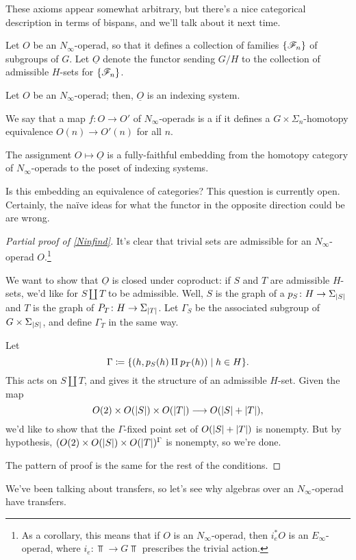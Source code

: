 These axioms appear somewhat arbitrary, but there's a nice categorical description in terms of bispans, and we'll
talk about it next time.
\begin{defn}
Let $O$ be an $N_\infty$-operad, so that it defines a collection of families $\{\mathscr F_n\}$ of subgroups of $G$.
Let $\underline O$ denote the functor sending $G/H$ to the collection of admissible $H$-sets for $\{\mathscr F_n\}$.
\end{defn}
\begin{prop}
\label{Ninfind}
Let $O$ be an $N_\infty$-operad; then, $\underline O$ is an indexing system.
\end{prop}
We say that a map $f\colon O\to O'$ of $N_\infty$-operads is a  if it defines a
$G\times\Sigma_n$-homotopy equivalence $O(n)\to O'(n)$ for all $n$.
\begin{thm}
The assignment $O\mapsto\underline O$ is a fully-faithful embedding from the homotopy category of
$N_\infty$-operads to the poset of indexing systems.
\end{thm}
\begin{ques}
Is this embedding an equivalence of categories? This question is currently open. Certainly, the naïve ideas for
what the functor in the opposite direction could be are wrong.
\end{ques}
\begin{proof}[Partial proof of \cref{Ninfind}]
It's clear that trivial sets are admissible for an $N_\infty$-operad $O$.\footnote{As a corollary, this means that
if $O$ is an $N_\infty$-operad, then $i_e^*O$ is an $E_\infty$-operad, where $i_e\colon\Top\to G\Top$ prescribes
the trivial action.}

We want to show that $\underline O$ is closed under coproduct: if $S$ and $T$ are admissible $H$-sets, we'd like
for $S\amalg T$ to be admissible. Well, $S$ is the graph of a $p_S\colon H\to\Sigma_{\lvert S\rvert}$ and $T$ is the graph
of $P_T\colon H\to\Sigma_{\lvert T\rvert}$. Let $\Gamma_S$ be the associated subgroup of $G\times\Sigma_{\lvert S\rvert}$, and
define $\Gamma_T$ in the same way.

Let
\[\Gamma\coloneqq \{(h, p_S(h)\amalg p_T(h))\mid h\in H\}.\]
This acts on $S\amalg T$, and gives it the structure of an admissible $H$-set. Given the map
\[O(2)\times O(\lvert S\rvert)\times O(\lvert T\rvert)\longrightarrow O(\lvert S\rvert + \lvert T\rvert),\]
we'd like to show that the $\Gamma$-fixed point set of $O(\lvert S\rvert + \lvert T\rvert)$ is nonempty. But by hypothesis,
$(O(2)\times O(\lvert S\rvert)\times O(\lvert T\rvert)^\Gamma$ is nonempty, so we're done.

The pattern of proof is the same for the rest of the conditions.
\end{proof}
We've been talking about transfers, so let's see why algebras over an $N_\infty$-operad have transfers.

